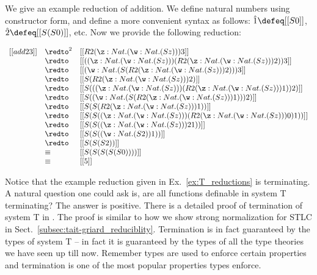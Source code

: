 \begin{example}
  \label{ex:T_reductions}
  We give an example reduction of addition.  We define natural numbers using constructor
  form, and define a more convenient syntax as follows:  
  $\hat{1} \defeq [[S 0]]$, $\hat{2} \defeq [[S (S 0)]]$, etc.  Now we provide the following
  reduction:
  \begin{center}
    \begin{math}
      \begin{array}{lll}
        [[add 2 3]] & \redto^2 &  [[R 2 (\z:Nat.(\w:Nat.(S z))) 3]]\\
             & \redto   & [[((\z:Nat.(\w:Nat.(S z))) (R 2 (\z:Nat.(\w:Nat.(S z))) 2)) 3]]\\
             & \redto   & [[(\w:Nat.(S (R 2 (\z:Nat.(\w:Nat.(S z))) 2))) 3]]\\
             & \redto   & [[S (R 2 (\z:Nat.(\w:Nat.(S z))) 2)]]\\
             & \redto   & [[S (((\z:Nat.(\w:Nat.(S z))) (R 2 (\z:Nat.(\w:Nat.(S z))) 1)) 2)]]\\
             & \redto   & [[S ((\w:Nat.(S (R 2 (\z:Nat.(\w:Nat.(S z))) 1))) 2)]]\\
             & \redto   & [[S (S (R 2 (\z:Nat.(\w:Nat.(S z))) 1))]]\\
             & \redto   & [[S (S ((\z:Nat.(\w:Nat.(S z))) (R 2 (\z:Nat.(\w:Nat.(S z))) 0) 1))]]\\
             & \redto   & [[S (S ((\z:Nat.(\w:Nat.(S z))) 2 1))]]\\
             & \redto   & [[S (S ((\w:Nat.(S 2)) 1))]]\\
             & \redto   & [[S (S (S 2))]] \\
             & \equiv   & [[S (S (S (S (S 0))))]] \\
             & \equiv   & [[5]]
      \end{array}
    \end{math}
  \end{center}
\end{example}

Notice that the example reduction given in Ex.~\ref{ex:T_reductions}
is terminating.  A natural question one could ask is, are all
functions definable in system T terminating?  The answer is positive.
There is a detailed proof of termination of system T in
\cite{Girard:1989}.  The proof is similar to how we show strong
normalization for STLC in
Sect.~\ref{subsec:tait-griard_reduciblity}. Termination is in fact
guaranteed by the types of system T -- in fact it is guaranteed by the
types of all the type theories we have seen up till now.  Remember
types are used to enforce certain properties and termination is one of
the most popular properties types enforce.
